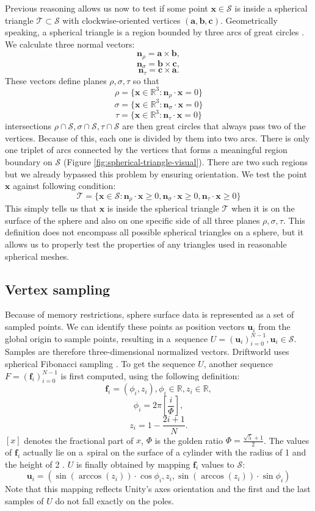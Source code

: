 Previous reasoning allows us now to test if some point $\mathbf{x}\in\mathcal{S}$ is inside a spherical triangle $\mathcal{T}\subset\mathcal{S}$ with clockwise-oriented vertices $(\mathbf{a}, \mathbf{b}, \mathbf{c})$.
Geometrically speaking, a spherical triangle is a region bounded by three arcs of great circles \cite{palmer}. We calculate three normal vectors:
$$\mathbf{n}_{\rho}=\mathbf{a}\times\mathbf{b},$$
$$\mathbf{n}_{\sigma}=\mathbf{b}\times\mathbf{c},$$
$$\mathbf{n}_{\tau}=\mathbf{c}\times\mathbf{a}.$$
These vectors define planes $\rho, \sigma, \tau$ so that
$$\rho=\{\mathbf{x}\in\mathbb{R}^3:\mathbf{n}_{\rho}\cdot\mathbf{x}=0\}$$
$$\sigma=\{\mathbf{x}\in\mathbb{R}^3:\mathbf{n}_{\sigma}\cdot\mathbf{x}=0\}$$
$$\tau=\{\mathbf{x}\in\mathbb{R}^3:\mathbf{n}_{\tau}\cdot\mathbf{x}=0\}$$
intersections $\rho\cap\mathcal{S}, \sigma\cap\mathcal{S}, \tau\cap\mathcal{S}$ are then great circles that always pass two of the vertices. Because of this, each one is divided by them into two arcs. There is only one triplet of arcs connected by the vertices that forms a meaningful region boundary on $\mathcal{S}$ (Figure \ref{fig:spherical-triangle-visual}). There are two such regions but we already bypassed this problem by ensuring orientation. We test the point $\mathbf{x}$ against following condition:
$$\mathcal{T}=\{\mathbf{x}\in\mathcal{S}:\mathbf{n}_{\rho}\cdot\mathbf{x}\ge 0, \mathbf{n}_{\sigma}\cdot\mathbf{x}\ge 0, \mathbf{n}_{\tau}\cdot\mathbf{x}\ge 0\}$$
This simply tells us that $\mathbf{x}$ is inside the spherical triangle $\mathcal{T}$ when it is on the surface of the sphere and also on one specific side of all three planes $\rho, \sigma, \tau$. This definition does not encompass all possible spherical triangles on a sphere, but it allows us to properly test the properties of any triangles used in reasonable spherical meshes.
\subsection{Vertex sampling}
Because of memory restrictions, sphere surface data is represented as a set of sampled points. We can identify these points as position vectors $\mathbf{u}_i$ from the global origin to sample points, resulting in a~sequence $U=\left(\mathbf{u}_i\right)_{i=0}^{N-1}, \mathbf{u}_i \in \mathcal{S}$. Samples are therefore three-dimensional normalized vectors. Driftworld uses spherical Fibonacci sampling \cite{keinert}. To get the sequence $U$, another sequence $F=\left(\mathbf{f}_i\right)_{i=0}^{N-1}$ is first computed, using the following definition:
$$\mathbf{f}_i=(\phi_i, z_i), \phi_i \in \mathbb{R}, z_i \in \mathbb{R},$$
$$\phi_i = 2\pi\left[\frac{i}{\Phi}\right],$$
$$z_i = 1-\frac{2i+1}{N}.$$
$\left[x\right]$ denotes the fractional part of $x$, $\Phi$ is the golden ratio $\Phi=\frac{\sqrt{5}+1}{2}$. The values of $\mathbf{f}_i$ actually lie on a~spiral on the surface of a cylinder with the radius of 1 and the height of 2 \cite{keinert}. $U$ is finally obtained by mapping $\mathbf{f}_i$ values to $\mathcal{S}$:
$$\mathbf{u}_i = (\sin{(\arccos{(z_i)})}\cdot\cos{\phi_i}, z_i, \sin{(\arccos{(z_i)})}\cdot\sin{\phi_i})$$
Note that this mapping reflects Unity's axes orientation and the first and the last samples of $U$ do not fall exactly on the poles.

